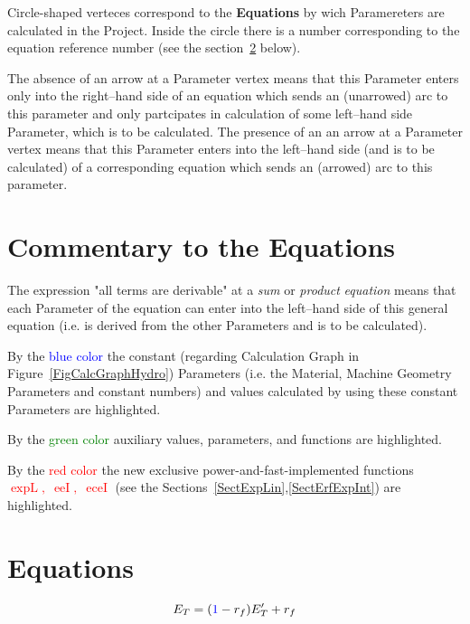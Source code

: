 \documentclass[12pt,reqno,intlimits,twoside]{amsart}
\DeclareMathOperator{\expL}{expL}%
\DeclareMathOperator{\eeI}{eeI}%
\DeclareMathOperator{\eceI}{eceI}%
\begin{document}
Circle-shaped verteces  correspond to the \textbf{Equations} by wich Paramereters are calculated in the Project.
Inside the circle there is a number corresponding to the equation reference number (see the section~\ref{SectEquations} below).

The absence of an arrow at a Parameter vertex means that this Parameter enters only into the right--hand side of
an equation which sends an (unarrowed) arc to this parameter and only partcipates in calculation of some left--hand side Parameter,
which is to be calculated.
The presence of an an arrow at a Parameter vertex means that this Parameter enters into the left--hand side
(and is to be calculated) of a corresponding equation
which sends an (arrowed) arc to this parameter.

\section{Commentary to the Equations}

The expression  "all terms are derivable" at a \emph{sum} or \emph{product} \emph{equation} means that each Parameter of the equation can enter
into the left--hand side of this general equation (i.e. is derived from the other Parameters and is to be calculated).

By the \textcolor{blue}{blue color} the constant (regarding Calculation Graph in Figure~\ref{FigCalcGraphHydro}) Parameters
(i.e. the Material, Machine Geometry Parameters and constant numbers)
and values calculated by using these constant Parameters are highlighted.

By the \textcolor{green}{green color} auxiliary values, parameters, and functions are highlighted.

By the \textcolor{red}{red color} the new exclusive power-and-fast-implemented functions
\textcolor{red}{$\expL,\;\eeI,\;\eceI$} (see the Sections~\ref{SectExpLin},\:\ref{SectErfExpInt}) are highlighted.

\section{Equations}\label{SectEquations}

\begin{equation}\label{EqERedTrfET} %
   E_T = (\textcolor{blue}{1} - r_f)E'_T + r_f
\end{equation}
\end{document}
